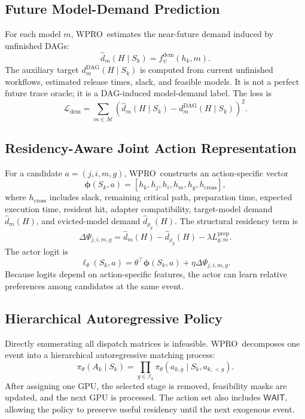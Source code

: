 \documentclass[10pt,conference]{IEEEtran}
\newcommand{\WPRO}{\textsc{WPRO}}
\newcommand{\calM}{\mathcal{M}}
\newcommand{\calI}{\mathcal{I}}
\newcommand{\phia}{\boldsymbol{\phi}}
\begin{document}
\subsection{Future Model-Demand Prediction}

For each model \(m\), \WPRO\ estimates the near-future demand induced by unfinished DAGs:
\begin{equation}
\hat d_m(H\mid S_k)=f_{\psi}^{\mathrm{dem}}(h_k,m).
\end{equation}
The auxiliary target \(d_m^{\mathrm{DAG}}(H\mid S_k)\) is computed from current unfinished workflows, estimated release times, slack, and feasible models. It is not a perfect future trace oracle; it is a DAG-induced model-demand label. The loss is
\begin{equation}
\mathcal{L}_{\mathrm{dem}}=\sum_{m\in\calM}
\left(\hat d_m(H\mid S_k)-d_m^{\mathrm{DAG}}(H\mid S_k)\right)^2.
\end{equation}

\subsection{Residency-Aware Joint Action Representation}

For a candidate \(a=(j,i,m,g)\), \WPRO\ constructs an action-specific vector
\begin{equation}
\phia(S_k,a)=[h_k,h_j,h_i,h_m,h_g,h_{\mathrm{cross}}],
\end{equation}
where \(h_{\mathrm{cross}}\) includes slack, remaining critical path, preparation time, expected execution time, resident hit, adapter compatibility, target-model demand \(\hat d_m(H)\), and evicted-model demand \(\hat d_{\rho_g}(H)\). The structural residency term is
\begin{equation}
\Delta\Psi_{j,i,m,g}=
\hat d_m(H)-\hat d_{\rho_g}(H)-\lambda L^{\mathrm{prep}}_{g,m}.
\end{equation}
The actor logit is
\begin{equation}
\ell_{\theta}(S_k,a)=\theta^\top\phia(S_k,a)+\eta\Delta\Psi_{j,i,m,g}.
\end{equation}
Because logits depend on action-specific features, the actor can learn relative preferences among candidates at the same event.

\subsection{Hierarchical Autoregressive Policy}

Directly enumerating all dispatch matrices is infeasible. \WPRO\ decomposes one event into a hierarchical autoregressive matching process:
\begin{equation}
\pi_{\theta}(A_k\mid S_k)=
\prod_{g\in\calI_k}
\pi_{\theta}(a_{k,g}\mid S_k,a_{k,<g}).
\end{equation}
After assigning one GPU, the selected stage is removed, feasibility masks are updated, and the next GPU is processed. The action set also includes \(\textsf{WAIT}\), allowing the policy to preserve useful residency until the next exogenous event.
\end{document}
